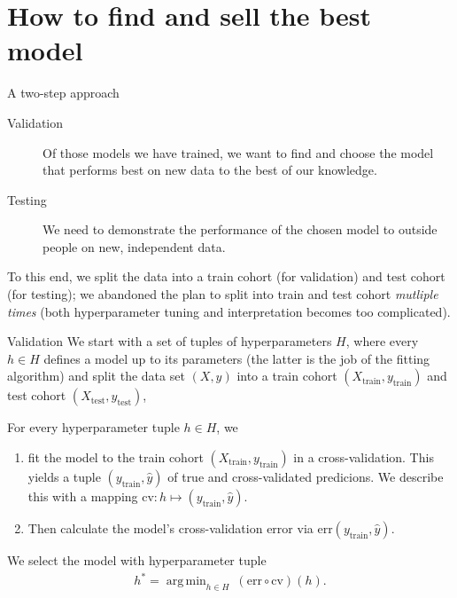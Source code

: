\documentclass[10pt, aspectratio=169]{beamer}
\DeclareMathOperator*{\argmin}{arg\,min}
\begin{document}
\section{How to find and sell the best model}

\begin{frame}{A two-step approach}
  \begin{description}
    \item[Validation] Of those models we have trained, we want to find and choose
       the model that performs best on new data to the best of \alert{our} knowledge.
    \item[Testing] We need to demonstrate the performance of the chosen model to 
      \alert{outside} people on new, independent data.
  \end{description}

  \pause
  To this end, we split the data into a train cohort (for validation) and test 
  cohort (for testing); we abandoned the plan to split into train and test cohort 
  \textit{mutliple times} (both hyperparameter tuning and interpretation becomes 
  too complicated).
\end{frame}

\begin{frame}{Validation}
  We start with a set of tuples of hyperparameters $H$, where every $h \in H$ 
  defines a model up to its parameters (the latter is the job of the fitting 
  algorithm) and split the data set $(X, y)$ into a train 
  cohort $(X_{\text{train}}, y_{\text{train}})$ and test cohort 
  $(X_{\text{test}}, y_{\text{test}})$,

  For every hyperparameter tuple $h \in H$, we
  \pause

  \begin{enumerate}
    \item fit the model to the train cohort $(X_{\text{train}}, y_{\text{train}})$
    in a cross-validation. This yields a tuple $(y_{\text{train}}, \hat{y})$
    of true and cross-validated predicions. We describe this with a mapping 
    $\text{cv}: h \mapsto (y_{\text{train}}, \hat{y})$.
    \pause
    \item Then calculate the model's cross-validation error via $\text{err}(
      y_{\text{train}}, \hat{y})$.
  \end{enumerate}

  We select the model with hyperparameter tuple
  \begin{align*}
    h^* = \argmin_{h \in H} \ (\text{err} \circ \text{cv})(h).
  \end{align*}
\end{frame}
\end{document}
